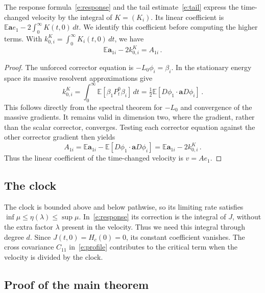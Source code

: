 \documentclass[11pt]{amsart}
\theoremstyle{definition}
\theoremstyle{remark}
\numberwithin{equation}{section}
\newcommand{\E}{\mathbb E}
\renewcommand{\a}{\mathbf a}
\newcommand{\dd}{\,d}
\begin{document}
The response formula~\eqref{e:response} and the tail estimate~\eqref{e:tail} express the time-changed velocity by the integral of $K=(K_i)$. Its linear coefficient is $\E\a e_1-2\int_0^\infty K(t,0)\,dt$. We identify this coefficient before computing the higher terms. With $k_{0,i}^K=\int_0^\infty K_i(t,0)\,dt$, we have
\begin{equation}\label{e:linear-velocity}
 \E\a_{1i}-2k_{0,i}^K=A_{1i}\, .
\end{equation}

\begin{proof}
The unforced corrector equation is $-L_0\phi_i=\beta_i$. In the stationary energy space its massive resolvent approximations give
\begin{equation*}
 k_{0,i}^K=\int_0^\infty\E[\beta_1P_t^0\beta_i]\dd t
       =\tfrac12\E[D\phi_1\cdot \a D\phi_i]\, .
\end{equation*}
This follows directly from the spectral theorem for $-L_0$ and convergence of the massive gradients. It remains valid in dimension two, where the gradient, rather than the scalar corrector, converges. Testing each corrector equation against the other corrector gradient then yields
\begin{equation*}
 A_{1i}=\E \a_{1i}-\E[D\phi_1\cdot \a D\phi_i]
       =\E \a_{1i}-2k_{0,i}^K\, .
\end{equation*}
Thus the linear coefficient of the time-changed velocity is $v=Ae_1$.


\end{proof}

\subsection{The clock}\label{ss.clock}

The clock is bounded above and below pathwise, so its limiting rate satisfies $\inf\mu\leq\eta(\lambda)\leq\sup\mu$. In~\eqref{e:response} its correction is the integral of $J$, without the extra factor $\lambda$ present in the velocity. Thus we need this integral through degree $d$. Since $J(t,0)=H_c(0)=0$, its constant coefficient vanishes. The cross covariance $C_{11}$ in~\eqref{e:profile} contributes to the critical term when the velocity is divided by the clock.

\subsection{Proof of the main theorem}\label{ss.proof-main}\label{s:integration}
\end{document}
